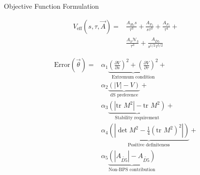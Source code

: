 \begin{frame}{Objective Function Formulation}
\blurbackground
\begin{tcolorbox}[
    enhanced,
    colback=black!85,
    colframe=Magenta,
    arc=3mm,
    boxrule=1.5pt,
    title={\color{Yellow!80!white}Scalar Potential Definition}
]
\vspace{-0.3cm}
\begin{align*}
V_{\text{eff}}(s, \tau, \vec{A}) = &\frac{A_{H_3} s}{\tau^3} + \frac{A_{F_3}}{s \tau^3} + \frac{A_{F_5}}{\tau^4} + \\
&\frac{A_3 \mathcal{N}_3}{\tau^3} + \frac{A_{\widetilde{D5}}}{s^{1/2} \tau^{5/2}}
\end{align*}
\end{tcolorbox}

\vspace{0.3cm}

\begin{tcolorbox}[
    enhanced,
    colback=black!85,
    colframe=LimeGreen,
    arc=3mm,
    boxrule=1.5pt,
    title={\color{Yellow!80!white}Error Function for Optimization}
]
\begin{align*}
\text{Error}(\vec{\theta}) = &\alpha_1 \underbrace{\left(\frac{\partial V}{\partial s}\right)^2 + \left(\frac{\partial V}{\partial \tau}\right)^2}_{\text{Extremum condition}} + \\
&\alpha_2 \underbrace{\left(|V| - V\right)}_{\text{dS preference}} + \\
&\alpha_3 \underbrace{\left(|\text{tr } M^2| - \text{tr } M^2\right)}_{\text{Stability requirement}} + \\
&\alpha_4 \underbrace{\left(|\det M^2 - \frac{1}{4}(\text{tr } M^2)^2|\right)}_{\text{Positive definiteness}} + \\
&\alpha_5 \underbrace{\left(|A_{\widetilde{D5}}| - A_{\widetilde{D5}}\right)}_{\text{Non-BPS contribution}}
\end{align*}
\end{tcolorbox}
\end{frame}

